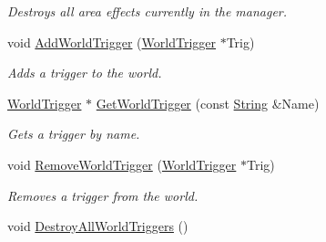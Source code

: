 \begin{DoxyCompactItemize}
\begin{DoxyCompactList}\small\item\em Destroys all area effects currently in the manager. \item\end{DoxyCompactList}\item 
void \hyperlink{classphys_1_1PhysicsManager_abed0578d971b6df80120a0a5fcc4a1d9}{AddWorldTrigger} (\hyperlink{classphys_1_1WorldTrigger}{WorldTrigger} $\ast$Trig)
\begin{DoxyCompactList}\small\item\em Adds a trigger to the world. \item\end{DoxyCompactList}\item 
\hyperlink{classphys_1_1WorldTrigger}{WorldTrigger} $\ast$ \hyperlink{classphys_1_1PhysicsManager_a6d55d03e86909138587c0b36012ba4a6}{GetWorldTrigger} (const \hyperlink{namespacephys_aa03900411993de7fbfec4789bc1d392e}{String} \&Name)
\begin{DoxyCompactList}\small\item\em Gets a trigger by name. \item\end{DoxyCompactList}\item 
void \hyperlink{classphys_1_1PhysicsManager_a48bd725a1a2b3e8193b549a915ef4dc2}{RemoveWorldTrigger} (\hyperlink{classphys_1_1WorldTrigger}{WorldTrigger} $\ast$Trig)
\begin{DoxyCompactList}\small\item\em Removes a trigger from the world. \item\end{DoxyCompactList}\item 
\hypertarget{classphys_1_1PhysicsManager_a778ebdcf3d67f4527978f51bb4249af2}{
void \hyperlink{classphys_1_1PhysicsManager_a778ebdcf3d67f4527978f51bb4249af2}{DestroyAllWorldTriggers} ()}
\label{classphys_1_1PhysicsManager_a778ebdcf3d67f4527978f51bb4249af2}


\end{DoxyCompactItemize}
